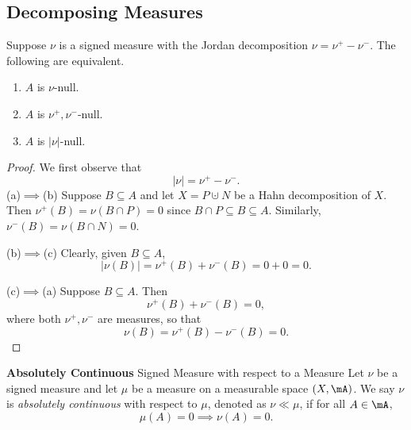 \documentclass[pmath451]{subfiles}
\begin{document}
    \subsection{Decomposing Measures}

    \begin{prop}{}
        Suppose $\nu$ is a signed measure with the Jordan decomposition $\nu=\nu^+-\nu^-$. The following are equivalent.
        \begin{enumerate}
            \item $A$ is $\nu$-null.
            \item $A$ is $\nu^+,\nu^-$-null.
            \item $A$ is $\left| \nu \right|$-null.
        \end{enumerate}
    \end{prop}

    \begin{proof}
        We first observe that
        \begin{equation*}
            \left| \nu \right| = \nu^+-\nu^-.
        \end{equation*}
        (a)$\implies$(b) Suppose $B\subseteq A$ and let $X = P\cupdot N$ be a Hahn decomposition of $X$. Then $\nu^+\left( B \right) = \nu\left( B\cap P \right) = 0$ since $B\cap P \subseteq B \subseteq A$. Similarly, $\nu^-\left( B \right) = \nu\left( B\cap N \right) = 0$.

        (b)$\implies$(c) Clearly, given $B\subseteq A$,
        \begin{equation*}
            \left| \nu\left( B \right) \right| = \nu^+\left( B \right)+\nu^-\left( B \right) = 0 + 0 = 0.
        \end{equation*}

        (c)$\implies$(a) Suppose $B\subseteq A$. Then
        \begin{equation*}
            \nu^+\left( B \right)+\nu^-\left( B \right) = 0,
        \end{equation*}
        where both $\nu^+,\nu^-$ are measures, so that
        \begin{equation*}
            \nu\left( B \right) = \nu^+\left( B \right)-\nu^-\left( B \right) = 0.
        \end{equation*}
    \end{proof}
    
    \begin{definition}{\textbf{Absolutely Continuous} Signed Measure with respect to a Measure}
        Let $\nu$ be a signed measure and let $\mu$ be a measure on a measurable space $\left( X,\mA \right)$. We say $\nu$ is \emph{absolutely continuous} with respect to $\mu$, denoted as $\nu\ll\mu$, if for all $A\in\mA$,
        \begin{equation*}
            \mu\left( A \right) = 0 \implies \nu\left( A \right) = 0.
        \end{equation*}
    \end{definition}
    
\end{document}
